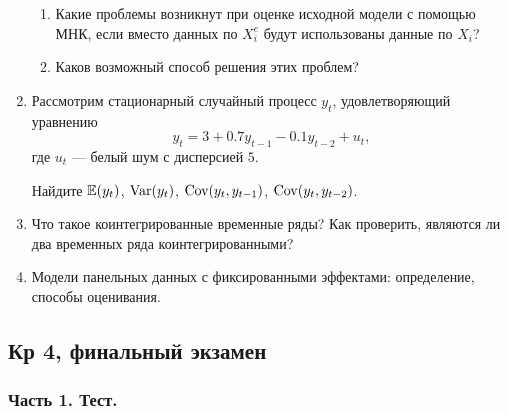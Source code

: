 \documentclass[12pt, a4paper]{article}\usepackage[]{graphicx}\usepackage[]{color}
\begin{document}
\begin{enumerate}
\begin{enumerate}
\item Какие проблемы возникнут при оценке исходной модели с помощью МНК, если вместо данных по $X^e_i$ будут использованы данные по $X_i$?
\item Каков возможный способ решения этих проблем?
\end{enumerate}







\item Рассмотрим стационарный случайный процесс $y_t$, удовлетворяющий уравнению
\[
y_t = 3 + 0.7 y_{t-1} - 0.1 y_{t-2} + u_t,
\]
где $u_t$ — белый шум с дисперсией $5$.

Найдите $\mathbb{E}(y_t)$, $\operatorname{Var}(y_t)$, $\operatorname{Cov}(y_t, y_{t-1})$, $\operatorname{Cov}(y_t, y_{t-2})$.

\item Что такое коинтегрированные временные ряды? Как проверить, являются ли два временных ряда коинтегрированными?

\item Модели панельных данных с фиксированными эффектами: определение, способы оценивания.

\end{enumerate}



\subsection{Кр 4, финальный экзамен}

\subsubsection*{Часть 1. Тест.}





\end{document}
